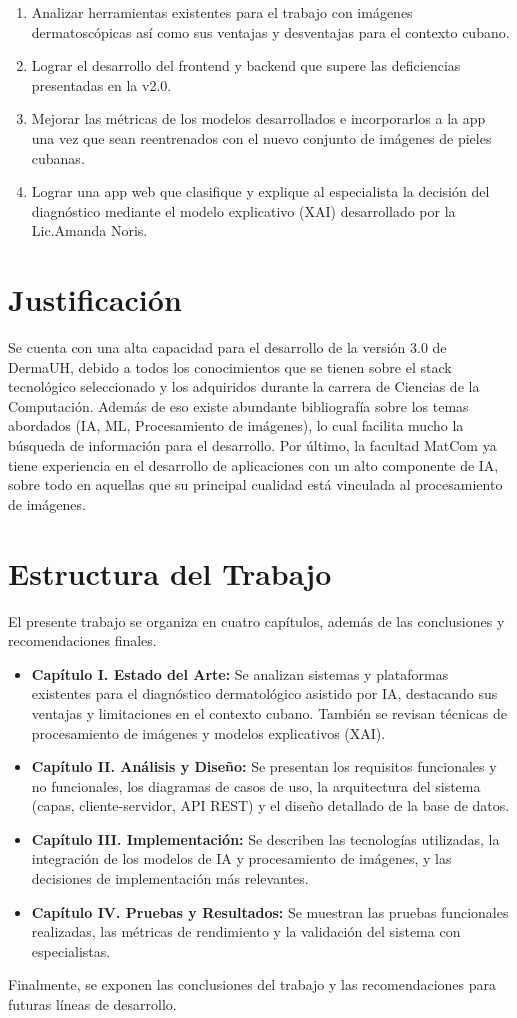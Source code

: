 \begin{enumerate}
    \item Analizar herramientas existentes para el trabajo con im\'agenes dermatosc\'opicas as\'i como sus ventajas y desventajas para el contexto cubano.
    \item Lograr el desarrollo del frontend y backend que supere las deficiencias presentadas en la v2.0.
    \item Mejorar las m\'etricas de los modelos desarrollados e incorporarlos a la app una vez que sean reentrenados con el nuevo conjunto de im\'agenes de pieles cubanas.
    \item Lograr una app web que clasifique y explique al especialista la decisi\'on del diagn\'ostico mediante el modelo explicativo (XAI) desarrollado por la Lic.Amanda Noris\cite{tesisAmanda}.
\end{enumerate}

\section{Justificaci\'on}
Se cuenta con una alta capacidad para el desarrollo de la versi\'on 3.0 de DermaUH, debido a todos 
los conocimientos que se tienen sobre el stack tecnol\'ogico seleccionado y los adquiridos durante 
la carrera de Ciencias de la Computaci\'on. Adem\'as de eso existe abundante bibliograf\'ia sobre 
los temas abordados (IA, ML, Procesamiento de im\'agenes), lo cual facilita mucho la b\'usqueda de 
informaci\'on para el desarrollo. Por \'ultimo, la facultad MatCom ya tiene experiencia en el desarrollo
de aplicaciones con un alto componente de IA, sobre todo en aquellas que su principal cualidad
est\'a vinculada al procesamiento de im\'agenes.

\section{Estructura del Trabajo}
El presente trabajo se organiza en cuatro capítulos, además de las conclusiones y recomendaciones finales.

\begin{itemize}
    \item \textbf{Capítulo I. Estado del Arte:} Se analizan sistemas y plataformas existentes para el diagnóstico dermatológico asistido por IA, destacando sus ventajas y limitaciones en el contexto cubano. También se revisan técnicas de procesamiento de imágenes y modelos explicativos (XAI).
    \item \textbf{Capítulo II. Análisis y Diseño:} Se presentan los requisitos funcionales y no funcionales, los diagramas de casos de uso, la arquitectura del sistema (capas, cliente-servidor, API REST) y el diseño detallado de la base de datos.
    \item \textbf{Capítulo III. Implementación:} Se describen las tecnologías utilizadas, la integración de los modelos de IA y procesamiento de imágenes, y las decisiones de implementación más relevantes.
    \item \textbf{Capítulo IV. Pruebas y Resultados:} Se muestran las pruebas funcionales realizadas, las métricas de rendimiento y la validación del sistema con especialistas.
\end{itemize}

Finalmente, se exponen las conclusiones del trabajo y las recomendaciones para futuras líneas de desarrollo.
